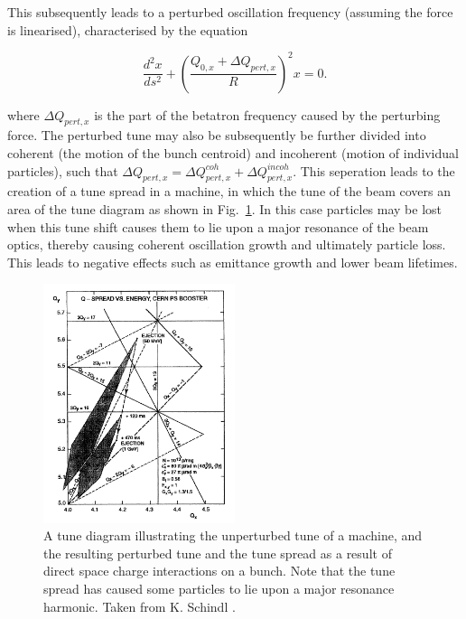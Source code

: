 This subsequently leads to a perturbed oscillation frequency (assuming the force is linearised), characterised by the equation

\begin{equation}
\frac{d^{2}x}{ds^{2}} + \left(\frac{Q_{0,x}+ \Delta Q_{pert,x}}{R}\right)^{2} x = 0.
\end{equation}

where $\Delta Q_{pert,x}$ is the part of the betatron frequency caused by the perturbing force. The perturbed tune may also be subsequently be further divided into coherent (the motion of the bunch centroid) and incoherent (motion of individual particles), such that $\Delta Q_{pert,x} = \Delta Q^{coh}_{pert, x} + \Delta Q^{incoh}_{pert, x}$. This seperation leads to the creation of a tune spread in a machine, in which the tune of the beam covers an area of the tune diagram as shown in Fig.~\ref{fig:tune_diag_tune_shift}. In this case particles may be lost when this tune shift causes them to lie upon a major resonance of the beam optics, thereby causing coherent oscillation growth and ultimately particle loss. This leads to negative effects such as emittance growth and lower beam lifetimes.

\begin{figure}
\begin{center}
\includegraphics[width=0.5\textwidth]{Wakefields_and_Impedances/figures/tune-spread-sc.png}
\end{center}
\caption{A tune diagram illustrating the unperturbed tune of a machine, and the resulting perturbed tune and the tune spread as a result of direct space charge interactions on a bunch. Note that the tune spread has caused some particles to lie upon a major resonance harmonic. Taken from K. Schindl \cite{Schindl:SpaceCharge}.}
\label{fig:tune_diag_tune_shift}
\end{figure}

